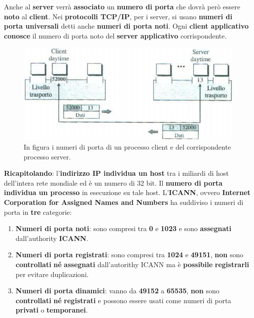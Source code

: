 \documentclass[11pt,a4paper]{article}
\theoremstyle{definition}
\begin{document}
Anche al \textbf{server} verrà \textbf{associato} un \textbf{numero di porta} che dovrà però essere \textbf{noto} al \textbf{client}. Nei \textbf{protocolli TCP/IP},  per i server, si usano \textbf{numeri di porta universali} detti anche \textbf{numeri di porta noti}. Ogni \textbf{client applicativo conosce} il numero di porta noto del \textbf{server applicativo} corrispondente.\newline\newline
\begin{figure}[!h]
	\includegraphics[scale=0.5]{Immagini/Port_numb.png}
	\centering
	\caption{In figura i numeri di porta di un processo client e del corrispondente processo server.}
\end{figure}\newline
\textbf{Ricapitolando}: l'\textbf{indirizzo IP individua un host} tra i miliardi di host dell'intera rete mondiale ed è un numero di 32 bit. Il \textbf{numero di porta individua un processo} in esecuzione su tale host.
\newpage
L'\textbf{ICANN}, ovvero \textbf{Internet Corporation for Assigned Names and Numbers} ha suddiviso i numeri di porta in \textbf{tre} categorie:
\begin{enumerate}
	\item \textbf{Numeri di porta noti}: sono compresi tra \textbf{0} e \textbf{1023} e sono \textbf{assegnati} dall'authority \textbf{ICANN}.
	\item \textbf{Numeri di porta registrati}: sono compresi tra \textbf{1024} e \textbf{49151}, \textbf{non} sono \textbf{controllati} \textbf{né} \textbf{assegnati} dall'autorithy ICANN ma è \textbf{possibile} \textbf{registrarli} per evitare duplicazioni.
	\item \textbf{Numeri di porta dinamici}: vanno da \textbf{49152} a \textbf{65535}, \textbf{non} sono \textbf{controllati} \textbf{né} \textbf{registrati} e possono essere usati come numeri di porta \textbf{privati} o \textbf{temporanei}.
\end{enumerate}
\end{document}
